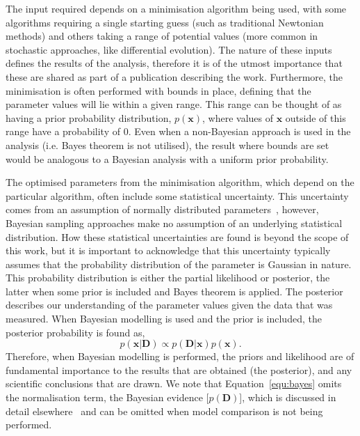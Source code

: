 \documentclass[reprint,superscriptaddress,aps,amsmath]{revtex4-2}
\begin{document}
The input required depends on a minimisation algorithm being used, with some algorithms requiring a single starting guess (such as traditional Newtonian methods) and others taking a range of potential values (more common in stochastic approaches, like differential evolution). 
The nature of these inputs defines the results of the analysis, therefore it is of the utmost importance that these are shared as part of a publication describing the work. 
Furthermore, the minimisation is often performed with bounds in place, defining that the parameter values will lie within a given range. 
This range can be thought of as having a prior probability distribution, $p(\mathbf{x})$, where values of $\mathbf{x}$ outside of this range have a probability of \num{0}. 
Even when a non-Bayesian approach is used in the analysis (i.e. Bayes theorem is not utilised), the result where bounds are set would be analogous to a Bayesian analysis with a uniform prior probability. 

The optimised parameters from the minimisation algorithm, which depend on the particular algorithm, often include some statistical uncertainty.
This uncertainty comes from an assumption of normally distributed parameters~\cite{bevington_data_2002}, however, Bayesian sampling approaches make no assumption of an underlying statistical distribution.
How these statistical uncertainties are found is beyond the scope of this work, but it is important to acknowledge that this uncertainty typically assumes that the probability distribution of the parameter is Gaussian in nature. 
This probability distribution is either the partial likelihood or posterior, the latter when some prior is included and Bayes theorem is applied. The posterior describes our understanding of the parameter values given the data that was measured.
When Bayesian modelling is used and the prior is included, the posterior probability is found as, 
%
\begin{equation}
  p(\mathbf{x} | \mathbf{D}) \propto p(\mathbf{D} | \mathbf{x}) p(\mathbf{x}).
  \label{equ:bayes}
\end{equation}
%
Therefore, when Bayesian modelling is performed, the priors and likelihood are of fundamental importance to the results that are obtained (the posterior), and any scientific conclusions that are drawn. 
We note that Equation~\ref{equ:bayes} omits the normalisation term, the Bayesian evidence [$p(\mathbf{D})$], which is discussed in detail elsewhere~\cite{sivia_bayesian_1998,mccluskey_general_2020} and can be omitted when model comparison is not being performed. 
\end{document}
